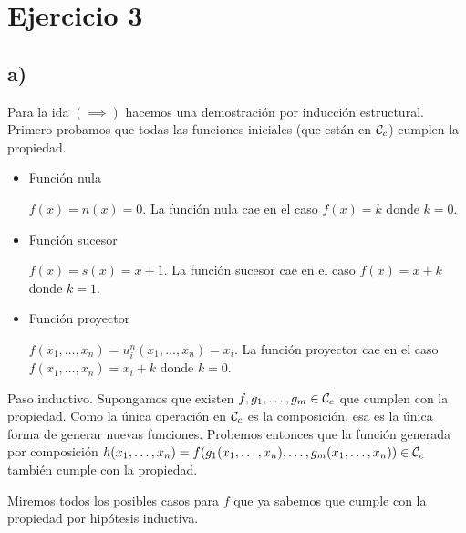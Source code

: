 \section*{Ejercicio 3}

\subsection*{a)}

Para la ida $(\implies)$ hacemos una demostración por inducción estructural. Primero probamos que todas las funciones iniciales (que están en $\mathcal{C}_c$) cumplen la propiedad.

\begin{itemize}
    \item Función nula

    $f(x) = n(x) = 0$. La función nula cae en el caso $f(x) = k$ donde $k = 0$.

    \item Función sucesor

    $f(x) = s(x) = x + 1$. La función sucesor cae en el caso $f(x) = x + k$ donde $k = 1$.

    \item Función proyector

    $f(x_1, \dots, x_n) = u^n_i(x_1, \dots, x_n) = x_i$. La función proyector cae en el caso $f(x_1, \dots, x_n) = x_i + k$ donde $k = 0$.
\end{itemize}

Paso inductivo. Supongamos que existen $f, g_1, \dots, g_m \in \mathcal{C}_c$ que cumplen con la propiedad. Como la única operación en $\mathcal{C}_c$ es la composición, esa es la única forma de generar nuevas funciones. Probemos entonces que la función generada por composición $h(x_1, \dots, x_n) = f(g_1(x_1, \dots, x_n), \dots, g_m(x_1, \dots, x_n)) \in \mathcal{C}_c$ también cumple con la propiedad.

Miremos todos los posibles casos para $f$ que ya sabemos que cumple con la propiedad por hipótesis inductiva.

